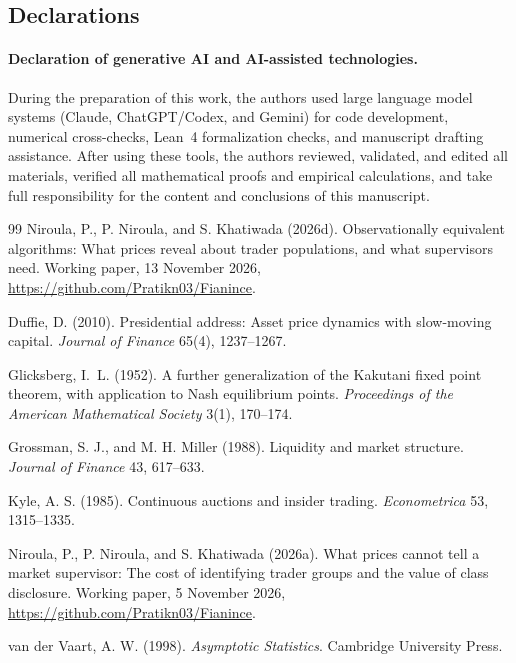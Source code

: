 \documentclass[12pt]{article}
\theoremstyle{definition}
\theoremstyle{remark}
\begin{document}
\subsection*{Declarations}

\paragraph{Declaration of generative AI and AI-assisted technologies.} During the preparation of this work, the authors used large language model systems (Claude, ChatGPT/Codex, and Gemini) for code development, numerical cross-checks, Lean~4 formalization checks, and manuscript drafting assistance. After using these tools, the authors reviewed, validated, and edited all materials, verified all mathematical proofs and empirical calculations, and take full responsibility for the content and conclusions of this manuscript.


\begin{thebibliography}{99}\setlength{\itemsep}{2pt}\small
{} Niroula, P., P. Niroula, and S. Khatiwada (2026d). Observationally equivalent algorithms: What prices reveal about trader populations, and what supervisors need. Working paper, 13 November 2026, \url{https://github.com/Pratikn03/Fianince}.

 Duffie, D. (2010). Presidential address: Asset price dynamics with slow-moving capital. \emph{Journal of Finance} 65(4), 1237--1267.

 Glicksberg, I.~L. (1952). A further generalization of the Kakutani fixed point theorem, with application to Nash equilibrium points. \emph{Proceedings of the American Mathematical Society} 3(1), 170--174.

 Grossman, S. J., and M. H. Miller (1988). Liquidity and market structure. \emph{Journal of Finance} 43, 617--633.

 Kyle, A. S. (1985). Continuous auctions and insider trading. \emph{Econometrica} 53, 1315--1335.

 Niroula, P., P. Niroula, and S. Khatiwada (2026a). What prices cannot tell a market supervisor: The cost of identifying trader groups and the value of class disclosure. Working paper, 5 November 2026, \url{https://github.com/Pratikn03/Fianince}.

 van der Vaart, A. W. (1998). \emph{Asymptotic Statistics}. Cambridge University Press.

\end{thebibliography}
\end{document}
